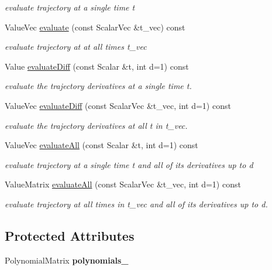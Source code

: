 \begin{DoxyCompactItemize}
\begin{DoxyCompactList}\small\item\em evaluate trajectory at a single time t \end{DoxyCompactList}\item 
Value\+Vec \hyperlink{classow__core_1_1PolynomialTrajectory_aa26e8738094dc78f390cc9f6e687219c}{evaluate} (const Scalar\+Vec \&t\+\_\+vec) const 
\begin{DoxyCompactList}\small\item\em evaluate trajectory at at all times t\+\_\+vec \end{DoxyCompactList}\item 
Value \hyperlink{classow__core_1_1PolynomialTrajectory_a4f3cacc1020584ac3154dd78de5ad37b}{evaluate\+Diff} (const Scalar \&t, int d=1) const 
\begin{DoxyCompactList}\small\item\em evaluate the trajectory derivatives at a single time t. \end{DoxyCompactList}\item 
Value\+Vec \hyperlink{classow__core_1_1PolynomialTrajectory_a8fd7574c77193772db62a75ba9e236d2}{evaluate\+Diff} (const Scalar\+Vec \&t\+\_\+vec, int d=1) const 
\begin{DoxyCompactList}\small\item\em evaluate the trajectory derivatives at all t in t\+\_\+vec. \end{DoxyCompactList}\item 
Value\+Vec \hyperlink{classow__core_1_1PolynomialTrajectory_af82466bb0a5e65a0f96959641e8768e3}{evaluate\+All} (const Scalar \&t, int d=1) const 
\begin{DoxyCompactList}\small\item\em evaluate trajectory at a single time t and all of its derivatives up to d \end{DoxyCompactList}\item 
Value\+Matrix \hyperlink{classow__core_1_1PolynomialTrajectory_a16a09b0ff476780e8058ba4dbc9381ca}{evaluate\+All} (const Scalar\+Vec \&t\+\_\+vec, int d=1) const 
\begin{DoxyCompactList}\small\item\em evaluate trajectory at all times in t\+\_\+vec and all of its derivatives up to d. \end{DoxyCompactList}\end{DoxyCompactItemize}
\subsection*{Protected Attributes}
\begin{DoxyCompactItemize}
\item 
Polynomial\+Matrix {\bfseries polynomials\+\_\+}\hypertarget{classow__core_1_1PolynomialTrajectory_a946a2b79d703b131c2dd8ecb63bb9dff}{}\label{classow__core_1_1PolynomialTrajectory_a946a2b79d703b131c2dd8ecb63bb9dff}

\end{DoxyCompactItemize}
